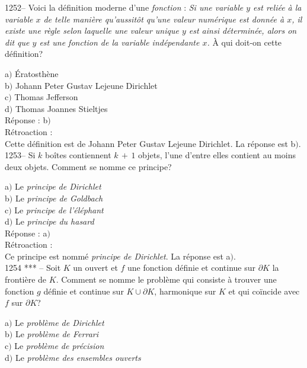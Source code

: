 ﻿\documentclass[letterpaper, 12pt]{article}
\begin{document}
1252-- Voici la d\'efinition moderne d'une {\sl fonction} : {\sl Si
une variable $y$ est reli\'ee \`a la variable $x$ de telle mani\`ere
qu'aussit\^ot qu'une valeur num\'erique est donn\'ee \`a $x$, il
existe une r\`egle selon laquelle une valeur unique $y$ est ainsi
d\'etermin\'ee, alors on dit que $y$ est une fonction de la variable
ind\'ependante $x$.} \`A qui doit-on cette d\'efinition?

a$)$ \'Eratosth\`ene \\
b$)$ Johann Peter Gustav Lejeune Dirichlet \\
c$)$ Thomas Jefferson \\
d$)$ Thomas Joannes Stieltjes\\

R\'eponse : b$)$\\

R\'etroaction : \\
Cette d\'efinition est de Johann Peter Gustav Lejeune Dirichlet.
La r\'eponse est b$)$.\\

1253-- Si $k$ bo\^ites contiennent $k\,+\,1$ objets, l'une d'entre
elles contient au moins deux objets. Comment se nomme ce principe?

a$)$ Le {\sl principe de Dirichlet} \\
b$)$ Le {\sl principe de Goldbach} \\
c$)$ Le {\sl principe de l'\'el\'ephant} \\
d$)$ Le {\sl principe du hasard}\\

R\'eponse : a$)$\\

R\'etroaction : \\
Ce principe est nomm\'e {\sl principe de Dirichlet}.
La r\'eponse est a$)$.\\

1254 *** -- Soit $K$ un ouvert et $f$ une fonction d\'efinie et
continue sur $\partial K$  la fronti\`ere de $K$. Comment se nomme
le probl\`eme qui consiste \`a trouver une fonction $g$ d\'efinie et
continue sur $K\cup\partial K$, harmonique sur $K$ et qui co\"incide
avec $f$ sur $\partial K$?

a$)$ Le {\sl probl\`eme de Dirichlet} \\
b$)$ Le {\sl probl\`eme de Ferrari} \\
c$)$ Le {\sl probl\`eme de pr\'ecision} \\
d$)$ Le {\sl probl\`eme des ensembles ouverts}\\
\end{document}
